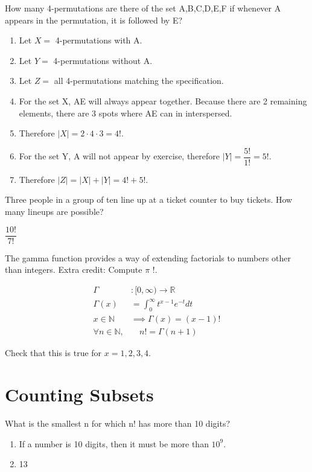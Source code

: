 \documentclass[openany, 11pt]{book}
\begin{document}
\begin{exercise}{}{}
	How many 4-permutations are there of the set A,B,C,D,E,F
	if whenever A appears in the permutation, it is followed by E?
	\begin{enumerate}[label={\textbullet}, leftmargin=*, itemsep=0pt, parsep=0pt]
		\item Let $X=$ 4-permutations with A.
		\item Let $Y=$ 4-permutations without A.
		\item Let $Z=$ all 4-permutations matching the specification.
		\item For the set X, AE will always appear together. Because there are 2
		      remaining elements, there are 3 spots where AE can in interspersed.
		\item Therefore $|X| = 2 \cdot 4\cdot3 = 4!.$
		\item For the set Y, A will not appear by exercise, therefore $|Y| =
			      \dfrac{5!}{1!} = 5!$.
		\item Therefore $|Z| = |X| + |Y| = 4! + 5!$. \square
	\end{enumerate}
\end{exercise}

\begin{exercise}{}{}
	Three people in a group of ten line up at a ticket counter to buy tickets.
	How many lineups are possible?

	$\dfrac{10!}{7!}$
\end{exercise}

\begin{exercise}{}{}
	The gamma function provides a way of extending factorials to numbers
	other than integers. Extra credit: Compute $\pi$ !.

	\begin{align*}
		\Gamma                    & :[0, \infty) \rightarrow \mathbb{R} \\
		\Gamma(x)                 & =\int_0^{\infty} t^{x-1} e^{-t} d t \\
		x \in \mathbb{N}          & \implies \Gamma(x)=(x-1)!           \\
		\forall n \in \mathbb{N}, & \quad n !=\Gamma(n+1)
	\end{align*}

	Check that this is true for $x=1,2,3,4$.
\end{exercise}

\section{Counting Subsets}
\begin{exercise}{}{}
	What is the smallest n for which n! has more than 10 digits?
	\begin{enumerate}[label={\textbullet}, leftmargin=*, itemsep=0pt, parsep=0pt]
		\item If a number is 10 digits, then it must be more than $10^{9}$.
		\item 13
	\end{enumerate}
\end{exercise}
\end{document}
